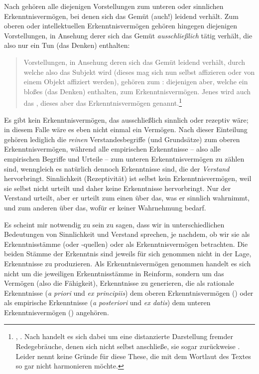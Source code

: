 Nach  gehören alle diejenigen Vorstellungen zum unteren
oder sinnlichen Erkenntnisvermögen, bei denen sich das Gemüt (auch!) leidend
verhält. Zum oberen oder intellektuellen Erkenntnisvermögen gehören hingegen
diejenigen Vorstellungen, in Ansehung derer sich das Gemüt \emph{ausschließlich} tätig verhält, die also nur ein Tun
(das Denken) enthalten:
\begin{quote}
Vorstellungen, in Ansehung deren sich das Gemüt leidend verhält, durch welche
also das Subjekt  wird (dieses mag sich nun selbst affizieren
oder von einem Objekt affiziert werden), gehören zum :
diejenigen aber, welche ein bloßes  (das  Denken) enthalten, zum
 Erkenntnisvermögen. Jenes wird auch das ,
dieses aber das  Erkenntnisvermögen
genannt.\footnote{\cite[][BA 25]{Kant:AnthropologieinpragmatischerHinsicht1977},
\cite[][VII: 140.23--28]{Kant:GesammelteWerke1900ff.}. Nach
handelt es sich dabei um eine distanzierte Darstellung fremder Redegebräuche,
denen sich  nicht selbst anschließe, sie sogar zurückweise
\parencite[vgl.][174]{Brandt:KritischerKommentarzuKantsenquoteAnthropologieinpragmatischerHinsicht1999}.
Leider nennt
keine Gründe für diese These, die mit dem Wortlaut des Textes so gar nicht
harmonieren möchte.}
\end{quote}
Es gibt kein Erkenntnisvermögen, das ausschließlich sinnlich oder rezeptiv wäre;
in diesem Falle wäre es eben nicht einmal ein Vermögen. Nach dieser Einteilung
gehören lediglich die \emph{reinen} Verstandesbegriffe (und Grundsätze) zum
oberen Erkenntnisvermögen, während alle empirischen Er\-kennt\-nis\-se -- also
alle empirischen Begriffe und Urteile -- zum unteren Erkenntnisvermögen zu
zählen sind, wenngleich es natürlich dennoch Erkenntnisse sind, die der
\emph{Verstand} hervorbringt. Sinnlichkeit (Rezeptivität) ist selbst kein
Erkenntnisvermögen, weil sie selbst nicht urteilt und daher keine Erkenntnisse
hervorbringt. Nur der Verstand urteilt, aber er urteilt zum einen über das, was
er sinnlich wahrnimmt, und zum anderen über das, wofür er keiner Wahrnehmung
bedarf.

Es scheint mir notwendig zu sein zu sagen, dass wir in unterschiedlichen
Bedeutungen von Sinnlichkeit und Verstand sprechen, je nachdem, ob wir sie als
Erkenntnisstämme (oder -quellen) oder als Erkenntnisvermögen betrachten. Die
beiden Stämme der Erkenntnis sind jeweils für sich genommen nicht in der Lage,
Erkenntnisse zu produzieren. Als Erkenntnisvermögen genommen handelt es sich
nicht um die jeweiligen Erkenntnisstämme in Reinform, sondern um das Vermögen
(also die Fähigkeit), Erkenntnisse zu generieren, die als rationale Erkenntnisse
(\emph{a priori} und \emph{ex principiis}) dem oberen Erkenntnisvermögen
() oder als empirische Erkenntnisse (\emph{a posteriori}
und \emph{ex datis}) dem unteren Erkenntnisvermögen () angehören.

